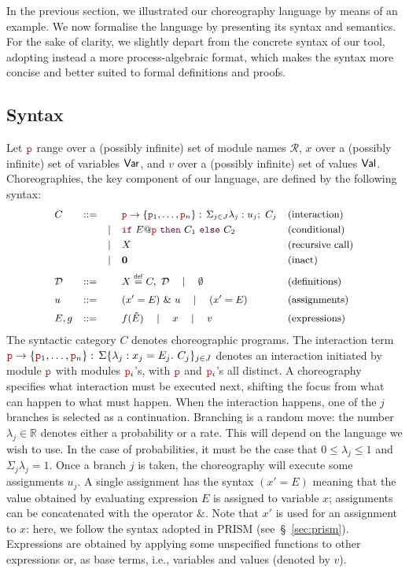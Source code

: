 %
In the previous section, we illustrated our choreography language by
means of an example. We now formalise the language by presenting its
syntax and semantics. For the sake of clarity, we slightly depart from
the concrete syntax of our tool, adopting instead a more
process-algebraic format, which makes the syntax more concise and
better suited to formal definitions and proofs.

\subsection{Syntax}\label{sub:syntax}
%
Let $\role p$ range over a (possibly infinite) set of module names
$\mathcal R$, $x$ over a (possibly infinite) set of variables $\mathsf{Var}$,
and $v$ over a (possibly infinite) set of values $\mathsf{Val}$.
%
Choreographies, the key component of our language, are defined by the
following syntax:
%
\begin{displaymath}\small
  \begin{array}{llllllllllll}
    C & ::= &      & \interact{\nr}{\nr_1,\ldots,\nr_n} & \text{(interaction)}\\[1mm]
      &     & \mid & \ifTE {E}{\nr}{C_1}{C_2} & \text{(conditional)}\\[1mm]
      &     & \mid & X     & \text{(recursive call)}\\[1mm]
      &     & \mid & \CEnd & \text{(inact)}
    \\[2mm]
    \defin \ & ::= & & X\stackrel{\textcolor{sh_keyword}{\mathsf{def}}}{=} C,\ \defin 
                     \quad \mid \quad \emptyset & \text{(definitions)}
    \\[2mm]
    u     & ::=  && (x' = E)\ \&\ u \quad\mid\quad    (x' = E) & \text{(assignments)}\\[2mm]
    E, g  & ::=  && f(\tilde E)\quad\mid\quad x\quad\mid\quad v & \text{(expressions)}
  \end{array}
\end{displaymath}
%
The syntactic category $C$ denotes choreographic programs. The
interaction term
$\nr\rightarrow \{\nr_1,\ldots,\nr_n\}:\,\Sigma\{\lambda_j: x_j=E_j.\
C_j\}_{j\in J}$ denotes an interaction initiated by module $\nr$ with
modules $\nr_i$'s, with $\nr$ and $\nr_i$'s all distinct. A
choreography specifies what interaction must be executed next,
shifting the focus from what can happen to what must happen. When the
interaction happens, one of the $j$ branches is selected as a
continuation. Branching is a random move: the number
$\lambda_j\in\mathbb R$ denotes either a probability or a rate. This
will depend on the language we wish to use. In the case of
probabilities, it must be the case that $0\leq\lambda_j\leq 1$ and
$\Sigma_j\lambda_j=1$. Once a branch $j$ is taken, the choreography
will execute some assignments $u_j$. A single assignment has the
syntax $(x' = E)$ meaning that the value obtained by evaluating
expression $E$ is assigned to variable $x$; assignments can be
concatenated with the operator $\&$.  Note that $x'$ is used for an
assignment to $x$: here, we follow the syntax adopted in PRISM
(see~\S~\ref{sec:prism}). Expressions are obtained by applying some
unspecified functions to other expressions or, as base terms, i.e.,
variables and values (denoted by $v$).
%

